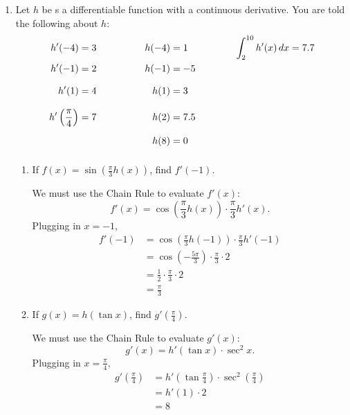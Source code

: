 \documentclass{article}
\begin{document}
\begin{enumerate}

\item
  \label{spring2006-midterm2-part2-3-shortened}
  
  Let $h$ be s a differentiable function with a continuous derivative. You are told the following about $h$: 
  \begin{alignat*}{6}
    h'(-4) &= 3 \qquad\qquad & h(-4) &= 1 \qquad\qquad & \int_2^{10}
    h'(x)\,dx &= 7.7 \\
    h'(-1) &= 2 & h(-1) &= -5  \\[8pt]
    h'(1) &= 4 & h(1) &= 3  \\[8pt]
    h' \left( \frac{\pi}{4} \right) & = 7 & h(2) &= 7.5  \\
    & & h(8) &= 0 \vphantom{\int} \\
  \end{alignat*}

  \begin{enumerate}

  \item
    \begin{problem}[\vfill]
      If $\displaystyle f(x) = \sin \left( \frac{\pi}{3} h(x) \right)$,
      find $f'(-1)$. 
    \end{problem}

    \begin{solution}
      We must use the Chain Rule to evaluate $f'(x)$:
      \[ f'(x) = \cos \left( \frac{\pi}{3} h(x) \right) \cdot
      \frac{\pi}{3} h'(x).\]  Plugging in $x = -1$,
      \begin{align*}
        f'(-1) &= \cos \left( \frac{\pi}{3} h(-1) \right) \cdot
        \frac{\pi}{3} h'(-1) \\
        &= \cos \left( -\frac{5 \pi}{3} \right) \cdot \frac{\pi}{3} \cdot
        2 \\
        &= \frac{1}{2} \cdot \frac{\pi}{3} \cdot 2 \\
        &= \boxed{\frac{\pi}{3}}
      \end{align*}
    \end{solution}

  \item
    \begin{problem}[\vfill]
      If $g(x) = h(\tan x)$, find $\displaystyle g' \left( \frac{\pi}{4}
      \right)$. 
    \end{problem}

    \begin{solution}
      We must use the Chain Rule to evaluate $g'(x)$:
      \[ g'(x) = h'(\tan x) \cdot \sec^2 x.\]
      Plugging in $x = \frac{\pi}{4}$,
      \begin{align*}
        g' \left( \frac{\pi}{4} \right) &= h' \left( \tan \frac{\pi}{4}
        \right) \cdot \sec^2 \left( \frac{\pi}{4} \right) \\
        &= h'(1) \cdot 2 \\
        &= \boxed{8}
      \end{align*}
    \end{solution}


\end{enumerate}
\end{enumerate}
\end{document}
